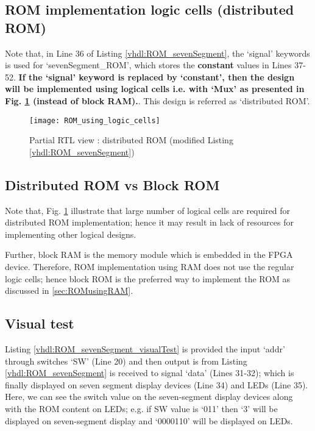 \subsection{ROM implementation logic cells (distributed ROM)}
Note that, in Line 36 of Listing \ref{vhdl:ROM_sevenSegment}, the `signal' keywords is used for `sevenSegment\_ROM', which stores the \textbf{constant} values in Lines 37-52. \textbf{If the `signal' keyword is replaced by `constant', then the design will be implemented using logical cells i.e. with `Mux' as presented in Fig. \ref{fig:ROM_using_logic_cells} (instead of block RAM).}. This design is referred as `distributed ROM'. 

\begin{figure}[!h]
	\centering
	\texttt{[image: ROM\_using\_logic\_cells]}
	\caption{Partial RTL view : distributed ROM  (modified Listing \ref{vhdl:ROM_sevenSegment})}
	\label{fig:ROM_using_logic_cells}
\end{figure}

\subsection{Distributed ROM vs Block ROM}

Note that, Fig. \ref{fig:ROM_using_logic_cells} illustrate that large number of logical cells are required for distributed ROM implementation; hence it may result in lack of resources for implementing other logical designs. 

Further, block RAM is the memory module which is embedded in the FPGA device.  Therefore, ROM implementation using RAM does not use the regular logic cells; hence block ROM is the preferred way to implement the ROM as discussed in \ref{sec:ROMusingRAM}. 


\subsection{Visual test}
Listing \ref{vhdl:ROM_sevenSegment_visualTest} is provided the input `addr' through switches `SW' (Line 20) and then output is from Listing \ref{vhdl:ROM_sevenSegment} is received to signal `data' (Lines 31-32); which is finally displayed on seven segment display devices (Line 34) and LEDs (Line 35). Here, we can see the switch value on the seven-segment display devices along with the ROM content on LEDs; e.g. if SW value is `011' then `3' will be displayed on seven-segment display and `0000110' will be displayed on LEDs. 



